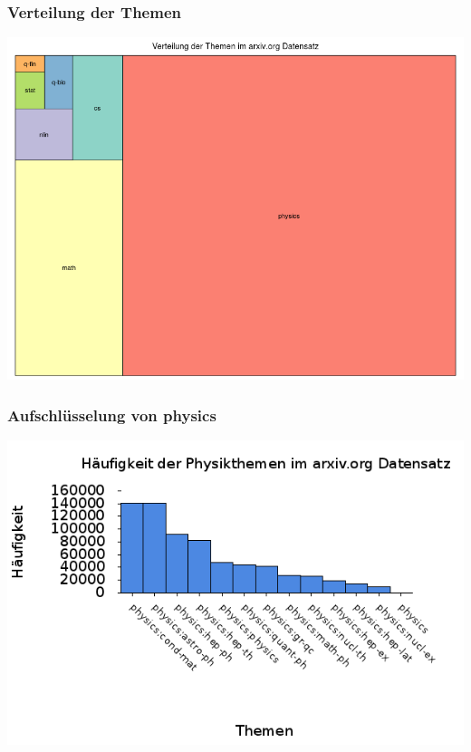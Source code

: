 \documentclass[12pt, xcolor=table]{beamer}
\begin{document}
\begin{frame}
	\frametitle{Verteilung der Themen}
	\begin{center}
		\includegraphics[scale=0.35]{../visual/treeParent.png}
	\end{center}
\end{frame}
\begin{frame}
	\frametitle{Aufschlüsselung von physics}
	\begin{center}
		\includegraphics[scale=0.45]{../visual/setSpecFreq.png}
	\end{center}
\end{frame}
\end{document}
